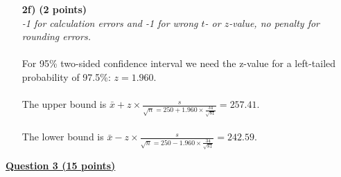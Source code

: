 \begin{itemize}
\item[\textbf{2f)}] \textbf{(2 points)} \\
     \textit{-1 for calculation errors and -1 for wrong $t$- or $z$-value, no penalty for rounding errors.} \\ 
     \\
     For 95\% two-sided confidence interval we need the z-value for a left-tailed probability of 97.5\%: $z = 1.960$. \\ \\The upper bound is $\bar{x} + z \times \frac{s}{\sqrt{n} = 250 + 1.960 \times \frac{34}{\sqrt{81}}} = 257.41$. \\ \\
     The lower bound is $\bar{x} - z \times \frac{s}{\sqrt{n} = 250 - 1.960 \times \frac{34}{\sqrt{81}}} = 242.59$.
\end{itemize}

\underline{\textbf{Question 3 (15 points)}} \\

